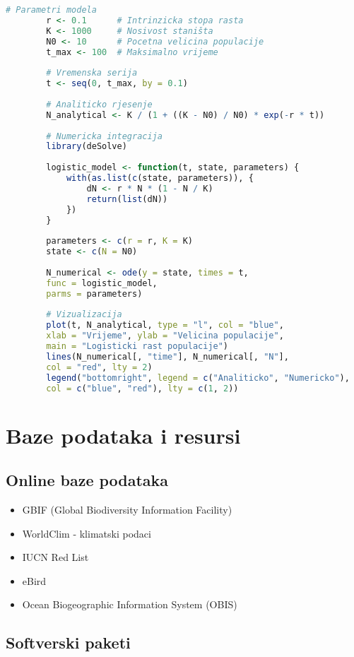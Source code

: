 \documentclass[12pt,a4paper,twoside]{book}
\begin{document}
	\begin{lstlisting}[language=R, caption=Implementacija logističkog modela u R]
		# Parametri modela
		r <- 0.1      # Intrinzicka stopa rasta
		K <- 1000     # Nosivost staništa
		N0 <- 10      # Pocetna velicina populacije
		t_max <- 100  # Maksimalno vrijeme
		
		# Vremenska serija
		t <- seq(0, t_max, by = 0.1)
		
		# Analiticko rjesenje
		N_analytical <- K / (1 + ((K - N0) / N0) * exp(-r * t))
		
		# Numericka integracija
		library(deSolve)
		
		logistic_model <- function(t, state, parameters) {
			with(as.list(c(state, parameters)), {
				dN <- r * N * (1 - N / K)
				return(list(dN))
			})
		}
		
		parameters <- c(r = r, K = K)
		state <- c(N = N0)
		
		N_numerical <- ode(y = state, times = t, 
		func = logistic_model, 
		parms = parameters)
		
		# Vizualizacija
		plot(t, N_analytical, type = "l", col = "blue", 
		xlab = "Vrijeme", ylab = "Velicina populacije",
		main = "Logisticki rast populacije")
		lines(N_numerical[, "time"], N_numerical[, "N"], 
		col = "red", lty = 2)
		legend("bottomright", legend = c("Analiticko", "Numericko"),
		col = c("blue", "red"), lty = c(1, 2))
	\end{lstlisting}
	
	\chapter{Baze podataka i resursi}
	
	\section{Online baze podataka}
	\begin{itemize}
		\item GBIF (Global Biodiversity Information Facility)
		\item WorldClim - klimatski podaci
		\item IUCN Red List
		\item eBird
		\item Ocean Biogeographic Information System (OBIS)
	\end{itemize}
	
	\section{Softverski paketi}
\end{document}
